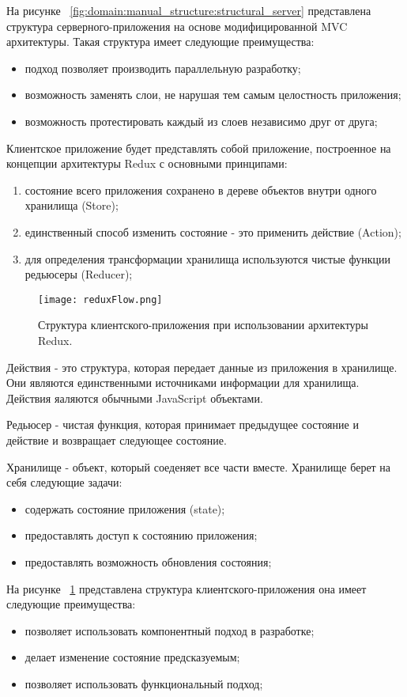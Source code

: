 На рисунке ~\ref{fig:domain:manual_structure:structural_server} представлена структура серверного-приложения на основе модифицированной MVC архитектуры. Такая структура имеет следующие преимущества:
\begin{itemize}
  \item подход позволяет производить параллельную разработку;
  \item возможность заменять слои, не нарушая тем самым целостность приложения;
  \item возможность протестировать каждый из слоев независимо друг от друга;
\end{itemize}

Клиентское приложение будет представлять собой приложение, построенное на концепции архитектуры Redux с основными принципами:
\begin{enumerate}
  \item состояние всего приложения сохранено в дереве объектов внутри одного хранилища (Store);
  \item единственный способ изменить состояние - это применить действие (Action);
  \item для определения трансформации хранилища используются чистые функции редьюсеры (Reducer);
\end{enumerate}
\begin{figure}[ht]
\centering
  \texttt{[image: reduxFlow.png]}  
  \caption{ Структура клиентского-приложения при использовании архитектуры Redux. }
  \label{fig:domain:manual_structure:structural_client}
\end{figure}

Действия - это структура, которая передает данные из приложения в хранилище. Они являются единственными источниками информации для хранилища. Действия яаляются обычными JavaScript объектами.

Редьюсер - чистая функция, которая принимает предыдущее состояние и действие и возвращает следующее состояние.

Хранилище - объект, который соеденяет все части вместе. Хранилище берет на себя следующие задачи:
\begin{itemize}
  \item содержать состояние приложения (state);
  \item предоставлять доступ к состоянию приложения;
  \item предоставлять возможность обновления состояния;
\end{itemize}

На рисунке ~\ref{fig:domain:manual_structure:structural_client} представлена структура клиентского-приложения она имеет следующие преимущества:
\begin{itemize}
  \item позволяет использовать компонентный подход в разработке;
  \item делает изменение состояние предсказуемым;
  \item позволяет использовать функциональный подход;
\end{itemize}

